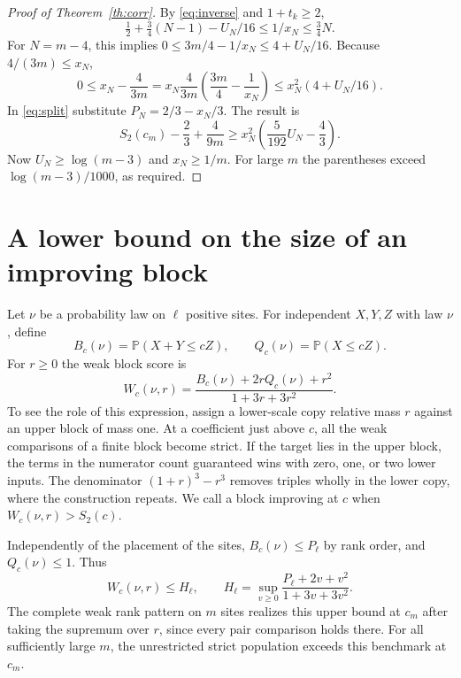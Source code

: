 \documentclass[11pt,reqno]{amsart}
\newcommand{\Prob}{\mathbb P}
\begin{document}
\begin{proof}[Proof of Theorem~\ref{th:corr}]
By \eqref{eq:inverse} and $1+t_k\ge2$,
\[
 \tfrac12+\tfrac34(N-1)-U_N/16
 \le 1/x_N \le \tfrac34 N.
\]
For $N=m-4$, this implies
$0\le 3m/4-1/x_N\le 4+U_N/16$. Because $4/(3m)\le x_N$,
\[
 0\le x_N-\frac4{3m}
     =x_N\frac4{3m}\left(\frac{3m}4-\frac1{x_N}\right)
     \le x_N^2(4+U_N/16).
\]
In \eqref{eq:split} substitute $P_N=2/3-x_N/3$. The result is
\[
 S_2(c_m)-\frac23+\frac4{9m}
 \ge x_N^2\left(\frac5{192}U_N-\frac43\right).
\]
Now $U_N\ge\log(m-3)$ and $x_N\ge1/m$. For large $m$ the
parentheses exceed $\log(m-3)/1000$, as required.
\end{proof}

\section{A lower bound on the size of an improving block}\label{sec:blocks}
Let $\nu$ be a probability law on $\ell$ positive sites. For independent
$X,Y,Z$ with law $\nu$, define
\[
 B_c(\nu)=\Prob(X+Y\le cZ),\qquad Q_c(\nu)=\Prob(X\le cZ).
\]
For $r\ge0$ the weak block score is
\[
 W_c(\nu,r)=\frac{B_c(\nu)+2rQ_c(\nu)+r^2}{1+3r+3r^2}.
\]
To see the role of this expression, assign a lower-scale copy relative
mass $r$ against an upper block of mass one. At a coefficient just
above $c$, all the weak comparisons of a finite block become strict.
If the target lies in the upper block, the terms in the numerator
count guaranteed wins with zero, one, or two lower inputs. The
denominator $(1+r)^3-r^3$ removes triples wholly in the lower copy,
where the construction repeats. We call a block improving at $c$
when $W_c(\nu,r)>S_2(c)$.

Independently of the placement of the sites, $B_c(\nu)\le P_\ell$
by rank order, and $Q_c(\nu)\le1$. Thus
\begin{equation}\label{eq:ceiling}
 W_c(\nu,r)\le H_\ell,\qquad
 H_\ell=\sup_{v\ge0}\frac{P_\ell+2v+v^2}{1+3v+3v^2}.
\end{equation}
The complete weak rank pattern on $m$ sites realizes this upper
bound at $c_m$ after taking the supremum over $r$, since every pair
comparison holds there. For all sufficiently large $m$, the unrestricted
strict population exceeds this benchmark at $c_m$.
\end{document}

